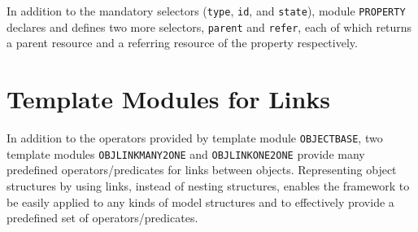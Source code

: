 \documentclass[12pt]{report}
\begin{document}
In addition to the mandatory selectors ({\tt type}, {\tt id}, and
{\tt state}), module {\tt PROPERTY} declares and defines two more
selectors, {\tt parent} and {\tt refer}, each of which returns a
parent resource and a referring resource of the property respectively.

\section{Template Modules for Links}
\label{sec:linkpred}
In addition to the operators provided by template module {\tt OBJECTBASE}, two
template modules {\tt OBJLINKMANY2ONE} and {\tt OBJLINKONE2ONE}
provide many predefined operators/predicates for links between
objects. Representing object structures by using links, instead of
nesting structures, enables the framework to be easily applied to any
kinds of model structures and to effectively provide a predefined set
of operators/predicates.
\end{document}
